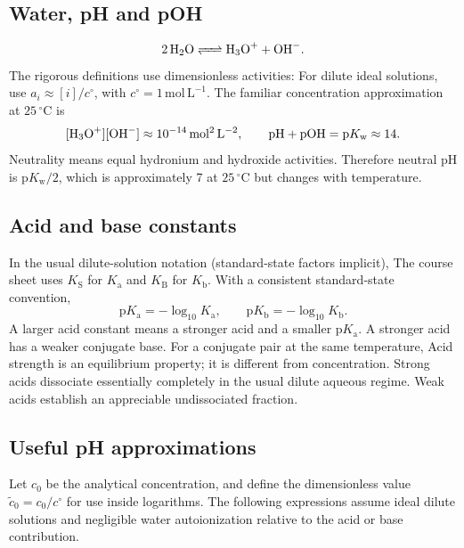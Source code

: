 \documentclass[a4paper,10pt]{article}
\newcommand{\chemunit}[1]{\,\mathrm{#1}}
\begin{document}
\subsection{Water, pH and pOH}
\[
 \ce{2 H2O <=> H3O+ + OH-}.
\]
The rigorous definitions use dimensionless activities:
For dilute ideal solutions, use $a_i\approx[i]/c^\circ$, with
$c^\circ=1\chemunit{mol\,L^{-1}}$. The familiar concentration approximation at
$25\,^{\circ}\mathrm C$ is
\[
 [\ce{H3O+}][\ce{OH-}]\approx10^{-14}\chemunit{mol^2\,L^{-2}},\qquad
 \mathrm{pH}+\mathrm{pOH}=\mathrm pK_{\mathrm w}\approx14.
\]
Neutrality means equal hydronium and hydroxide activities. Therefore neutral
pH is $\mathrm pK_{\mathrm w}/2$, which is approximately 7 at
$25\,^{\circ}\mathrm C$ but changes with temperature.

\subsection{Acid and base constants}
In the usual dilute-solution notation (standard-state factors implicit),
The course sheet uses $K_{\mathrm S}$ for $K_{\mathrm a}$ and $K_{\mathrm B}$
for $K_{\mathrm b}$. With a consistent standard-state convention,
\[
 \mathrm pK_{\mathrm a}=-\log_{10}K_{\mathrm a},\qquad
 \mathrm pK_{\mathrm b}=-\log_{10}K_{\mathrm b}.
\]
A larger acid constant means a stronger acid and a smaller $\mathrm pK_{\mathrm a}$.
A stronger acid has a weaker conjugate base. For a conjugate pair at the same
temperature,
Acid strength is an equilibrium property; it is different from concentration.
Strong acids dissociate essentially completely in the usual dilute aqueous
regime. Weak acids establish an appreciable undissociated fraction.

\subsection{Useful pH approximations}
Let $c_0$ be the analytical concentration, and define the dimensionless value
$\widetilde c_0=c_0/c^\circ$ for use inside logarithms. The following expressions
assume ideal dilute solutions and negligible water autoionization relative to
the acid or base contribution.
\end{document}
